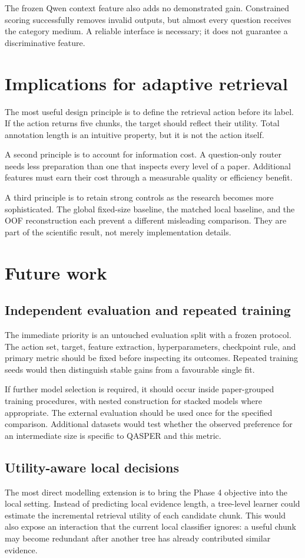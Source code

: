 The frozen Qwen context feature also adds no demonstrated gain.
Constrained scoring successfully removes invalid outputs, but
almost every question receives the category medium. A reliable
interface is necessary; it does not guarantee a discriminative
feature.

\section{Implications for adaptive retrieval}
The most useful design principle is to define the retrieval action
before its label. If the action returns five chunks, the target
should reflect their utility. Total annotation length is an
intuitive property, but it is not the action itself.

A second principle is to account for information cost. A question-only
router needs less preparation than one that inspects every level
of a paper. Additional features must earn their cost through a
measurable quality or efficiency benefit.

A third principle is to retain strong controls as the research
becomes more sophisticated. The global fixed-size baseline,
the matched local baseline, and the OOF reconstruction each
prevent a different misleading comparison. They are part of
the scientific result, not merely implementation details.

\section{Future work}
\subsection{Independent evaluation and repeated training}
The immediate priority is an untouched evaluation split with
a frozen protocol. The action set, target, feature extraction,
hyperparameters, checkpoint rule, and primary metric should
be fixed before inspecting its outcomes. Repeated training
seeds would then distinguish stable gains from a favourable
single fit.

If further model selection is required, it should occur inside
paper-grouped training procedures, with nested construction
for stacked models where appropriate. The external evaluation
should be used once for the specified comparison. Additional
datasets would test whether the observed preference for an
intermediate size is specific to QASPER and this metric.

\subsection{Utility-aware local decisions}
The most direct modelling extension is to bring the Phase 4
objective into the local setting. Instead of predicting local
evidence length, a tree-level learner could estimate the
incremental retrieval utility of each candidate chunk. This
would also expose an interaction that the current local
classifier ignores: a useful chunk may become redundant after
another tree has already contributed similar evidence.

